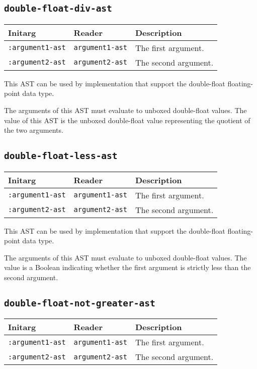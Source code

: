 \subsection{\texttt{double-float-div-ast}}
\label{sec-ast-double-float-div}

\begin{tabular}{|l|l|l|}
\hline
Initarg & Reader & Description\\
\hline\hline
\texttt{:argument1-ast} & \texttt{argument1-ast} & The first argument.\\
\hline
\texttt{:argument2-ast} & \texttt{argument2-ast} & The second argument.\\
\hline
\end{tabular}

This AST can be used by implementation that support the double-float
floating-point data type.  

The arguments of this AST must evaluate to unboxed double-float
values.  The value of this AST is the unboxed double-float value
representing the quotient of the two arguments.

\subsection{\texttt{double-float-less-ast}}
\label{sec-ast-double-float-less}

\begin{tabular}{|l|l|l|}
\hline
Initarg & Reader & Description\\
\hline\hline
\texttt{:argument1-ast} & \texttt{argument1-ast} & The first argument.\\
\hline
\texttt{:argument2-ast} & \texttt{argument2-ast} & The second argument.\\
\hline
\end{tabular}

This AST can be used by implementation that support the double-float
floating-point data type.  

The arguments of this AST must evaluate to unboxed double-float
values.  The value is a Boolean indicating whether the first argument
is strictly less than the second argument.

\subsection{\texttt{double-float-not-greater-ast}}
\label{sec-ast-double-float-not-greater}

\begin{tabular}{|l|l|l|}
\hline
Initarg & Reader & Description\\
\hline\hline
\texttt{:argument1-ast} & \texttt{argument1-ast} & The first argument.\\
\hline
\texttt{:argument2-ast} & \texttt{argument2-ast} & The second argument.\\
\hline
\end{tabular}

